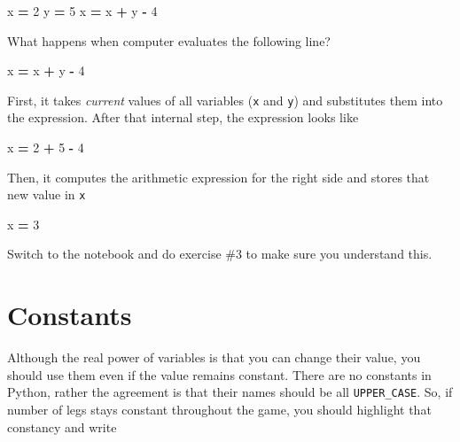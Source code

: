\documentclass[
]{book}
\newenvironment{Shaded}{\begin{snugshade}}{\end{snugshade}}
\newcommand{\DecValTok}[1]{\textcolor[rgb]{0.00,0.00,0.81}{#1}}
\newcommand{\NormalTok}[1]{#1}
\newcommand{\OperatorTok}[1]{\textcolor[rgb]{0.81,0.36,0.00}{\textbf{#1}}}
\begin{document}
\begin{Shaded}
\begin{Highlighting}[]
\NormalTok{x }\OperatorTok{=} \DecValTok{2}
\NormalTok{y }\OperatorTok{=} \DecValTok{5}
\NormalTok{x }\OperatorTok{=}\NormalTok{ x }\OperatorTok{+}\NormalTok{ y }\OperatorTok{{-}} \DecValTok{4}
\end{Highlighting}
\end{Shaded}

What happens when computer evaluates the following line?

\begin{Shaded}
\begin{Highlighting}[]
\NormalTok{x }\OperatorTok{=}\NormalTok{ x }\OperatorTok{+}\NormalTok{ y }\OperatorTok{{-}} \DecValTok{4}
\end{Highlighting}
\end{Shaded}

First, it takes \emph{current} values of all variables (\texttt{x} and \texttt{y}) and substitutes them into the expression. After that internal step, the expression looks like

\begin{Shaded}
\begin{Highlighting}[]
\NormalTok{x }\OperatorTok{=} \DecValTok{2} \OperatorTok{+} \DecValTok{5} \OperatorTok{{-}} \DecValTok{4}
\end{Highlighting}
\end{Shaded}

Then, it computes the arithmetic expression for the right side and stores that new value in \texttt{x}

\begin{Shaded}
\begin{Highlighting}[]
\NormalTok{x }\OperatorTok{=} \DecValTok{3}
\end{Highlighting}
\end{Shaded}

Switch to the notebook and do exercise \#3 to make sure you understand this.

\hypertarget{constants}{%
\section{Constants}\label{constants}}

Although the real power of variables is that you can change their value, you should use them even if the value remains constant. There are no constants in Python, rather the agreement is that their names should be all \texttt{UPPER\_CASE}. So, if number of legs stays constant throughout the game, you should highlight that constancy and write
\end{document}

